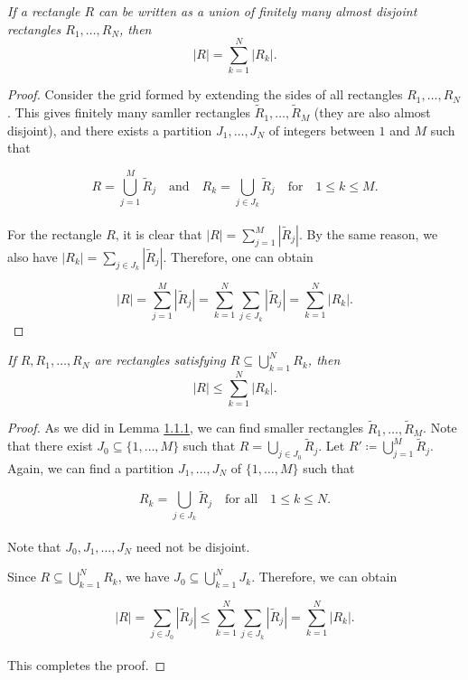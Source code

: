 \documentclass[12pt, a4paper, openany, twoside]{book}
\theoremstyle{definition}
\theoremstyle{remark}
\theoremstyle{plain}
\numberwithin{equation}{section}
\begin{document}
\begin{tcolorbox}[colback=yellow!10!white,colframe=red!75!black,title=Lemma 1.1.1]\label{Lemma 1.1.1}
    \emph{If a rectangle $R$ can be written as a union of finitely many almost disjoint rectangles $R_1,\dots, R_N$, then }
    \[|R|=\sum_{k=1}^{N}{|R_k|}.\]
\end{tcolorbox}
\begin{proof}
    Consider the grid formed by extending the sides of all rectangles $R_1,\dots, R_N$. This gives finitely many samller rectangles $\tilde{R}_1,\dots,\tilde{R}_M$ (they are also almost disjoint), and there exists a partition $J_1,\dots, J_N$ of integers between $1$ and $M$ such that

    \[R=\bigcup_{j=1}^{M}{\tilde{R}_j}\quad\text{and}\quad R_k=\bigcup_{j\in J_k}{\tilde{R}_j}\quad\text{for}\quad 1\leq k\leq M.\]
    \\
    For the rectangle $R$, it is clear that $|R|=\sum_{j=1}^{M}{|\tilde{R}_j|}$. By the same reason, we also have $|R_k|=\sum_{j\in J_k}{|\tilde{R}_j|}$. Therefore, one can obtain

    \[|R|=\sum_{j=1}^{M}{|\tilde{R}_j|}=\sum_{k=1}^{N}{\sum_{j\in J_k}{|\tilde{R}_j|}}=\sum_{k=1}^{N}{|R_k|}.\]
\end{proof}
\vspace{5mm}
\begin{tcolorbox}[colback=yellow!10!white,colframe=red!75!black,title=Lemma 1.1.2]\label{Lemma 1.1.2}
    \emph{If $R, R_1,\dots,R_N$ are rectangles satisfying $R\subseteq\bigcup_{k=1}^{N}{R_k}$, then}
    \[|R|\leq \sum_{k=1}^{N}{|R_k|}.\]
\end{tcolorbox}
\begin{proof}
    As we did in Lemma \hyperref[Lemma 1.1.1]{1.1.1}, we can find smaller rectangles $\tilde{R}_1,\dots,\tilde{R}_M$. Note that there exist $J_0\subseteq\{1,\dots, M\}$ such that $R=\bigcup_{j\in J_0}{\tilde{R}_j}$. Let $R'\coloneqq\bigcup_{j=1}^{M}{\tilde{R}_j}$. Again, we can find a partition $J_1,\dots, J_N$ of $\{1,\dots, M\}$ such that 

    \[R_k=\bigcup_{j\in J_k}{\tilde{R}_j}\quad\text{for all}\quad 1\leq k\leq N.\]
    \\
    Note that $J_0, J_1,\dots, J_N$ need not be disjoint. 
    
    Since $R\subseteq\bigcup_{k=1}^{N}{R_k}$, we have $J_0\subseteq\bigcup_{k=1}^{N}{J_k}$. Therefore, we can obtain

    \[|R|=\sum_{j\in J_0}{|\tilde{R}_j|}\leq \sum_{k=1}^{N}{\sum_{j\in J_k}{|\tilde{R}_j|}}=\sum_{k=1}^{N}{|R_k|}.\]
    \\
    This completes the proof.
\end{proof}
\end{document}
